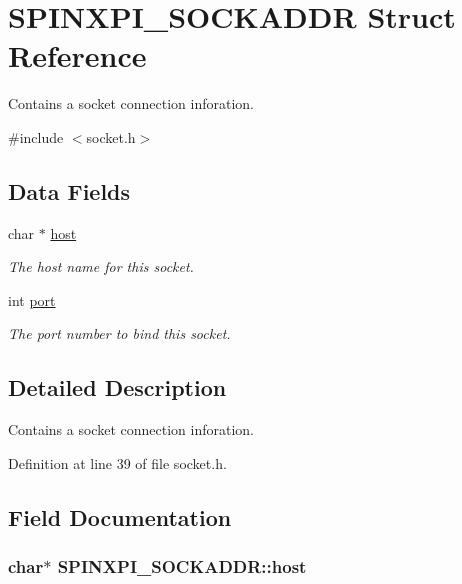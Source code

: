 \hypertarget{structSPINXPI__SOCKADDR}{\section{S\-P\-I\-N\-X\-P\-I\-\_\-\-S\-O\-C\-K\-A\-D\-D\-R Struct Reference}
\label{structSPINXPI__SOCKADDR}
}


Contains a socket connection inforation.  




{\ttfamily \#include $<$socket.\-h$>$}

\subsection*{Data Fields}
\begin{DoxyCompactItemize}
\item 
char $\ast$ \hyperlink{structSPINXPI__SOCKADDR_a0fd9f20866c5a881539c5c8209b7ba7e}{host}
\begin{DoxyCompactList}\small\item\em The host name for this socket. \end{DoxyCompactList}\item 
int \hyperlink{structSPINXPI__SOCKADDR_a9c502c5085ee437d3493e348e1f07989}{port}
\begin{DoxyCompactList}\small\item\em The port number to bind this socket. \end{DoxyCompactList}\end{DoxyCompactItemize}


\subsection{Detailed Description}
Contains a socket connection inforation. 

Definition at line 39 of file socket.\-h.



\subsection{Field Documentation}
\hypertarget{structSPINXPI__SOCKADDR_a0fd9f20866c5a881539c5c8209b7ba7e}{
\subsubsection[{host}]{\setlength{\rightskip}{0pt plus 5cm}char$\ast$ S\-P\-I\-N\-X\-P\-I\-\_\-\-S\-O\-C\-K\-A\-D\-D\-R\-::host}}\label{structSPINXPI__SOCKADDR_a0fd9f20866c5a881539c5c8209b7ba7e}


